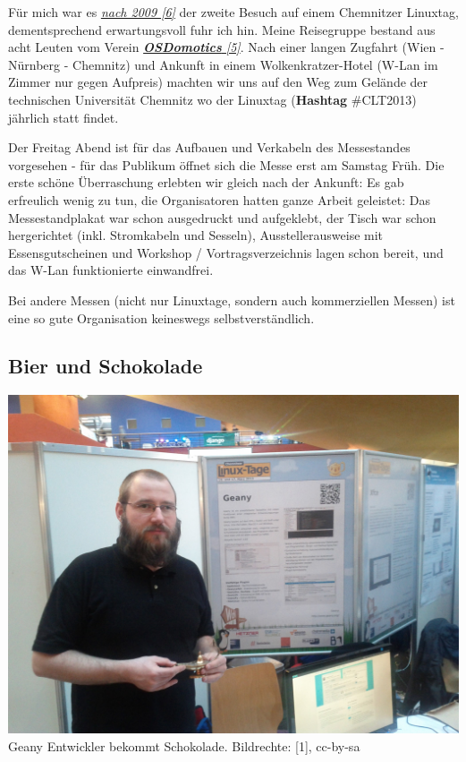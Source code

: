 \documentclass[10pt,a4paper,ngerman,twoside]{article} %
\begin{document}
\begin{multicols}{3}
Für mich war es \href{http://spielend-programmieren.at/de:sonstiges:alter_blog:2009:0318_chemnitzer_linux-tage_2009}{\textit{nach 2009 [6]}} der zweite Besuch auf einem Chemnitzer Linuxtag, dementsprechend erwartungsvoll fuhr ich hin. Meine Reisegruppe bestand aus acht Leuten vom Verein \href{http://osdomotics.com}{\textit{\textbf{OSDomotics} [5]}}. Nach einer langen Zugfahrt (Wien - Nürnberg - Chemnitz) und Ankunft in einem Wolkenkratzer-Hotel (W-Lan im Zimmer nur gegen Aufpreis) machten wir uns auf den Weg zum Gelände der technischen Universität Chemnitz wo der Linuxtag (\textbf{Hashtag} \#CLT2013) jährlich statt findet.

Der Freitag Abend ist für das Aufbauen und Verkabeln des Messestandes vorgesehen - für das Publikum öffnet sich die Messe erst am Samstag Früh. Die erste schöne Überraschung erlebten wir gleich nach der Ankunft: Es gab erfreulich wenig zu tun, die Organisatoren hatten ganze Arbeit geleistet: Das Messestandplakat war schon ausgedruckt und aufgeklebt, der Tisch war schon hergerichtet (inkl. Stromkabeln und Sesseln), Ausstellerausweise mit Essensgutscheinen und Workshop / Vortragsverzeichnis lagen schon bereit, und das W-Lan funktionierte einwandfrei. 

Bei andere Messen (nicht nur Linuxtage, sondern auch kommerziellen Messen) ist eine so gute Organisation keineswegs selbstverständlich.


\subsection*{Bier und Schokolade}

\begin{center}
\includegraphics[width=\linewidth]{chemnitz/chemnitz_geany1.jpg}
\footnotesize{Geany Entwickler bekommt Schokolade. Bildrechte: [1], cc-by-sa}
\end{center}


\end{multicols}
\end{document}
